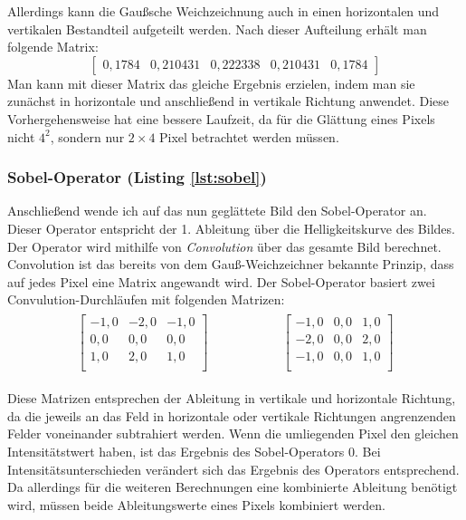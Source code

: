 Allerdings kann die Gaußsche Weichzeichnung auch in einen horizontalen und vertikalen Bestandteil aufgeteilt werden. Nach dieser Aufteilung erhält man folgende Matrix:
\begin{equation}
	\begin{bmatrix}
	0,1784&0,210431&0,222338&0,210431&0,1784
	\end{bmatrix}
\end{equation}
Man kann mit dieser Matrix das gleiche Ergebnis erzielen, indem man sie zunächst in horizontale und anschließend in vertikale Richtung anwendet. Diese Vorhergehensweise hat eine bessere Laufzeit, da für die Glättung eines Pixels nicht \(4^2\), sondern nur \(2\times 4\) Pixel betrachtet werden müssen.

\subsubsection{Sobel-Operator (Listing \ref{lst:sobel})}
Anschließend wende ich auf das nun geglättete Bild den Sobel-Operator an. Dieser Operator entspricht der 1. Ableitung über die Helligkeitskurve des Bildes. Der Operator wird mithilfe von \textit{Convolution} über das gesamte Bild berechnet. Convolution ist das bereits von dem Gauß-Weichzeichner bekannte Prinzip, dass auf jedes Pixel eine Matrix angewandt wird. Der Sobel-Operator basiert zwei Convulution-Durchläufen mit folgenden Matrizen:
\begin{gather}
	\begin{split}
		\begin{bmatrix}
			-1,0&-2,0&-1,0\\
			0,0&0,0&0,0\\
			1,0&2,0&1,0\\
		\end{bmatrix}
	\end{split}
	\hspace{5em}
	\begin{split}
		\begin{bmatrix}
			-1,0&0,0&1,0\\
			-2,0&0,0&2,0\\
			-1,0&0,0&1,0\\
		\end{bmatrix}
	\end{split}
\end{gather}

Diese Matrizen entsprechen der Ableitung in vertikale und horizontale Richtung, da die jeweils an das Feld in horizontale oder vertikale Richtungen angrenzenden Felder voneinander subtrahiert werden.
Wenn die umliegenden Pixel den gleichen Intensitätstwert haben, ist das Ergebnis des Sobel-Operators 0.
Bei Intensitätsunterschieden verändert sich das Ergebnis des Operators entsprechend.
Da allerdings für die weiteren Berechnungen eine kombinierte Ableitung benötigt wird, müssen beide Ableitungswerte eines Pixels kombiniert werden.

